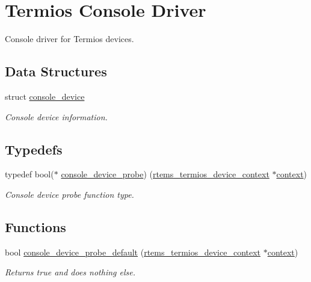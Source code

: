 \hypertarget{group__ConsoleTermios}{}\section{Termios Console Driver}
\label{group__ConsoleTermios}


Console driver for Termios devices.  


\subsection*{Data Structures}
\begin{DoxyCompactItemize}
\item 
struct \mbox{\hyperlink{structconsole__device}{console\+\_\+device}}
\begin{DoxyCompactList}\small\item\em Console device information. \end{DoxyCompactList}\end{DoxyCompactItemize}
\subsection*{Typedefs}
\begin{DoxyCompactItemize}
\item 
typedef bool($\ast$ \mbox{\hyperlink{group__ConsoleTermios_ga256c0a60dec13fd909e708ca271de6f1}{console\+\_\+device\+\_\+probe}}) (\mbox{\hyperlink{structrtems__termios__device__context}{rtems\+\_\+termios\+\_\+device\+\_\+context}} $\ast$\mbox{\hyperlink{sun4u_2tte_8h_a9b4a99475e2709333b8e5d70483173f1}{context}})
\begin{DoxyCompactList}\small\item\em Console device probe function type. \end{DoxyCompactList}\end{DoxyCompactItemize}
\subsection*{Functions}
\begin{DoxyCompactItemize}
\item 
\mbox{\label{group__ConsoleTermios_ga277813476b6c680269d9102dba5ddd48}} 
bool \mbox{\hyperlink{group__ConsoleTermios_ga277813476b6c680269d9102dba5ddd48}{console\+\_\+device\+\_\+probe\+\_\+default}} (\mbox{\hyperlink{structrtems__termios__device__context}{rtems\+\_\+termios\+\_\+device\+\_\+context}} $\ast$\mbox{\hyperlink{sun4u_2tte_8h_a9b4a99475e2709333b8e5d70483173f1}{context}})
\begin{DoxyCompactList}\small\item\em Returns true and does nothing else. \end{DoxyCompactList}\end{DoxyCompactItemize}
